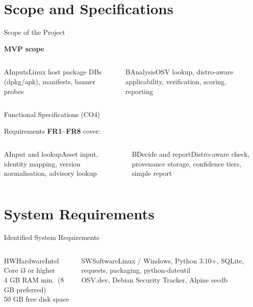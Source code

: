 \documentclass[aspectratio=169,12pt]{beamer}
\newlength{\ch}\setlength{\ch}{47mm}
\begin{document}
\section{Scope and Specifications}
\begin{frame}{Scope of the Project}
\begin{stmt}[height={14mm},height plus=30mm,fontupper=\Large]\textbf{MVP scope}\end{stmt}\vskip2.5mm\setlength{\ch}{31mm}
\begin{columns}[T,onlytextwidth]
\begin{tc}{A}{Inputs}\normalsize Linux host package DBs (dpkg/apk), manifests, banner probes\end{tc}
\begin{tcteal}{B}{Analysis}\normalsize OSV lookup, distro-aware applicability, verification, scoring, reporting\end{tcteal}
\end{columns}
\end{frame}

\begin{frame}{Functional Specifications (CO4)}
\begin{stmt}[height={14mm},height plus=30mm,fontupper=\Large]Requirements \textbf{FR1--FR8} cover:\end{stmt}\vskip2.5mm\setlength{\ch}{31mm}
\begin{columns}[T,onlytextwidth]
\begin{tc}{A}{Input and lookup}\normalsize Asset input, identity mapping, version normalisation, advisory lookup\end{tc}
\begin{tcteal}{B}{Decide and report}\normalsize Distro-aware check, provenance storage, confidence tiers, simple report\end{tcteal}
\end{columns}
\end{frame}

\section{System Requirements}
\begin{frame}{Identified System Requirements}
\setlength{\ch}{50mm}
\begin{columns}[T,onlytextwidth]
\begin{tc}{HW}{Hardware}\large Intel Core i3 or higher\\4 GB RAM min.\ (8 GB preferred)\\50 GB free disk space\end{tc}
\begin{tcteal}{SW}{Software}\normalsize Linux / Windows, Python 3.10+, SQLite, requests, packaging, python-dateutil\\OSV.dev, Debian Security Tracker, Alpine secdb\end{tcteal}
\end{columns}
\end{frame}
\end{document}
